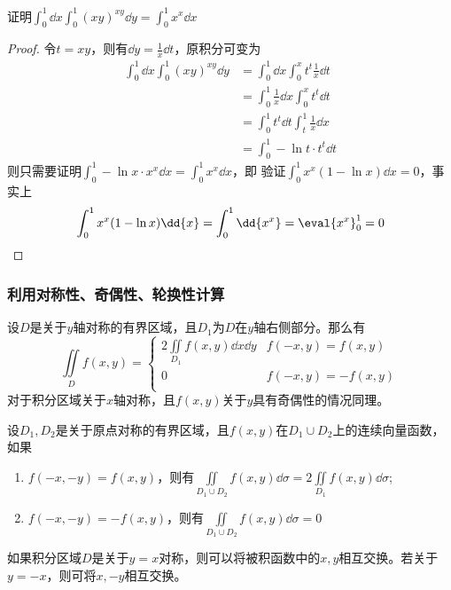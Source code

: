 \begin{example}
    证明$\displaystyle \int_0^1\dd{x}\int_0^1 (xy)^{xy}\dd{y} = \int_0^1 x^x \dd{x}$
\end{example}
\begin{proof}
    令$t=xy$，则有$\dd{y} = \frac{1}{x}\dd{t}$，原积分可变为
    \begin{align*}
        \int_0^1\dd{x}\int_0^1 (xy)^{xy}\dd{y}
         & = \int_0^1\dd{x}\int_0^x t^t\frac{1}{x}\dd{t}  \\
         & = \int_0^1 \frac{1}{x}\dd{x}\int_0^x t^t\dd{t} \\
         & = \int_0^1 t^t\dd{t}\int_t^1 \frac{1}{x}\dd{x} \\
         & =\int_0^1 -\ln{t}\cdot t^t\dd{t}
    \end{align*}
    则只需要证明$\displaystyle\int_0^1 -\ln{x}\cdot x^x\dd{x} = \int_0^1 x^x\dd{x}$，即
    验证$\displaystyle\int_0^1 x^x(1-\ln{x})\dd{x} = 0$，事实上
    \[ \int_0^1 x^x(1-\ln{x})\dd{x} = \int_0^1 \dd{x^x} = \eval{x^x}_0^1 = 0 \]
\end{proof}

\subsubsection{利用对称性、奇偶性、轮换性计算}
设$D$是关于$y$轴对称的有界区域，且$D_1$为$D$在$y$轴右侧部分。那么有
\begin{equation}
    \iint\limits_D f(x,y) =
    \begin{cases}
        2\iint\limits_{D_1} f(x,y)\dd{x}\dd{y} & f(-x,y)=f(x,y)  \\
        0                                      & f(-x,y)=-f(x,y) \\
    \end{cases}
\end{equation}
对于积分区域关于$x$轴对称，且$f(x,y)$关于$y$具有奇偶性的情况同理。

设$D_1,D_2$是关于原点对称的有界区域，且$f(x,y)$在$D_1\cup D_2$上的连续向量函数，如果
\begin{enumerate}[(1)]
    \item $f(-x,-y)=f(x,y)$，则有$\displaystyle\iint\limits_{D_1\cup D_2}f(x,y)\dd{\sigma}=2\iint\limits_{D_1}f(x,y)\dd{\sigma}$;
    \item $f(-x,-y)=-f(x,y)$，则有$\displaystyle\iint\limits_{D_1\cup D_2}f(x,y)\dd{\sigma}=0$
\end{enumerate}

如果积分区域$D$是关于$y=x$对称，则可以将被积函数中的$x,y$相互交换。若关于$y=-x$，则可将$x,-y$相互交换。

